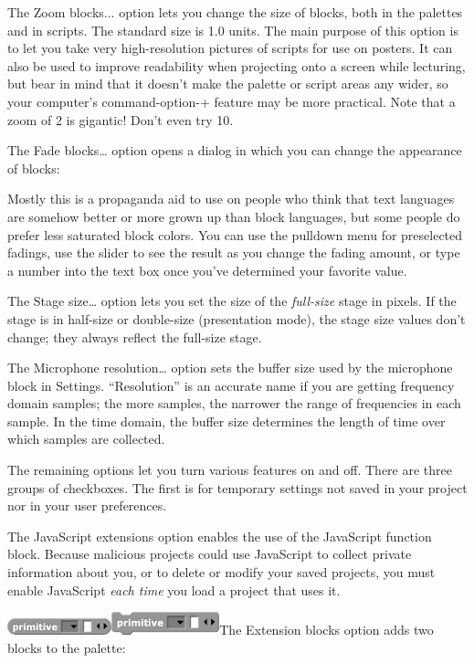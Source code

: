 The Zoom blocks... option lets you change the size of blocks, both in
the palettes and in scripts. The standard size is 1.0 units. The main
purpose of this option is to let you take very high-resolution pictures
of scripts for use on posters. It can also be used to improve
readability when projecting onto a screen while lecturing, but bear in
mind that it doesn't make the palette or script areas any wider, so your
computer's command-option-+ feature may be more practical. Note that a
zoom of 2 is gigantic! Don't even try 10.

The Fade blocks\ldots{} option opens a dialog in which you can change
the appearance of blocks:

Mostly this is a propaganda aid to use on people who think that text
languages are somehow better or more grown up than block languages, but
some people do prefer less saturated block colors. You can use the
pulldown menu for preselected fadings, use the slider to see the result
as you change the fading amount, or type a number into the text box once
you've determined your favorite value.

The Stage size\ldots{} option lets you set the size of the
\emph{full-size} stage in pixels. If the stage is in half-size or
double-size (presentation mode), the stage size values don't change;
they always reflect the full-size stage.

The Microphone resolution\ldots{} option sets the buffer size used by
the microphone block in Settings. ``Resolution'' is an accurate name if
you are getting frequency domain samples; the more samples, the narrower
the range of frequencies in each sample. In the time domain, the buffer
size determines the length of time over which samples are collected.

The remaining options let you turn various features on and off. There
are three groups of checkboxes. The first is for temporary settings not
saved in your project nor in your user preferences.

The JavaScript extensions option enables the use of the JavaScript
function block. Because malicious projects could use JavaScript to
collect private information about you, or to delete or modify your saved
projects, you must enable JavaScript \emph{each time} you load a project
that uses it.

\includegraphics[width=1.18958in,height=0.18958in]{media/image1021.png}\includegraphics[width=1.22986in,height=0.25972in]{media/image1022.png}The
Extension blocks option adds two blocks to the palette:

